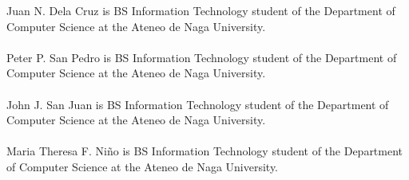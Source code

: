\begin{vita}

Juan N. Dela Cruz is BS Information Technology student of the Department of Computer Science at the Ateneo de Naga University.
\\
\\
Peter P. San Pedro is BS Information Technology student of the Department of Computer Science at the Ateneo de Naga University.
\\
\\
John J. San Juan is BS Information Technology student of the Department of Computer Science at the Ateneo de Naga University.
\\
\\
Maria Theresa F. Ni\~{n}o is BS Information Technology student of the Department of Computer Science at the Ateneo de Naga University.

\end{vita}